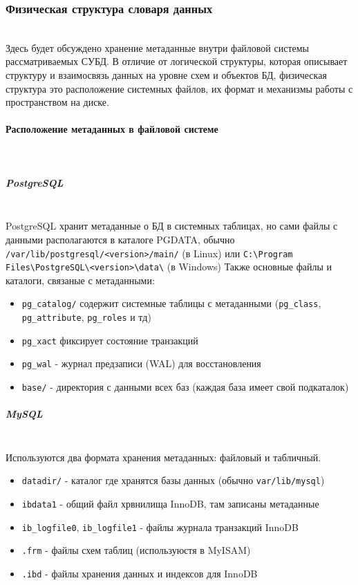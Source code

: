 \subsubsection{Физическая структура словаря данных} ~\\

Здесь будет обсуждено хранение метаданные внутри файловой системы рассматриваемых СУБД. В отличие от логической структуры, которая описывает структуру и взаимосвязь данных на уровне схем и объектов БД, физическая структура это расположение системных файлов, их формат и механизмы работы с пространством на диске.

\paragraph{Расположение метаданных в файловой системе} ~\\

\subparagraph{PostgreSQL} \autocite{PostgreSQLdocc65} ~\\

PostgreSQL хранит метаданные о БД в системных таблицах, но сами файлы с данными располагаются в каталоге PGDATA, обычно \texttt{/var/lib/postgresql/<version>/main/} (в Linux) или \texttt{C:\textbackslash{}Program Files\textbackslash{}PostgreSQL\textbackslash{}<version>\textbackslash{}data\textbackslash{}} (в Windows)
Также основные файлы и каталоги, связаные с метаданными:
\begin{itemize}
    \item \texttt{pg\_catalog/} содержит системные таблицы с метаданными (\texttt{pg\_class}, \texttt{pg\_attribute}, \texttt{pg\_roles} и тд)
    \item \texttt{pg\_xact} фиксирует состояние транзакций
    \item \texttt{pg\_wal} - журнал предзаписи (WAL) для восстановления
    \item \texttt{base/} - директория с данными всех баз (каждая база имеет свой подкаталок)
\end{itemize}

\subparagraph{MySQL} \autocite[§17.6]{Mysqldoc4} ~\\

Используются два формата хранения метаданных: файловый и табличный.

\begin{itemize}
    \item \texttt{datadir/} - каталог где хранятся базы данных (обычно \texttt{var/lib/mysql})
    \item \texttt{ibdata1} - общий файл хрвнилища InnoDB, там записаны метаданные 
    \item \texttt{ib\_logfile0}, \texttt{ib\_logfile1} - файлы журнала транзакций InnoDB 
    \item \texttt{.frm} - файлы схем таблиц (используюстя в MyISAM)
    \item \texttt{.ibd} - файлы хранения данных и индексов для InnoDB 
\end{itemize}

